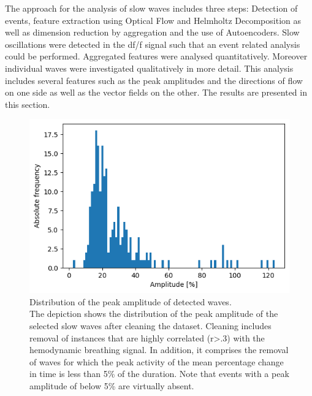  The approach for the analysis of slow waves includes three steps: Detection of events, feature extraction using Optical Flow and Helmholtz Decomposition as well as dimension reduction by aggregation and the use of Autoencoders. Slow oscillations were detected in the df/f signal such that an event related analysis could be performed. Aggregated features were analysed quantitatively. Moreover individual waves were investigated qualitatively in more detail. This analysis includes several features such as the peak amplitudes and the directions of flow on one side as well as the vector fields on the other. The results are presented in this section.\\
 \begin{figure}[!htb]
 \centering
 \includegraphics[width=\textwidth,height=\textheight,keepaspectratio]{Figures/selected_waves_distribution_of_peak_amplitude}
 \decoRule
 \caption[Distribution of the peak amplitude of detected waves]{Distribution of the peak amplitude of detected waves.\\The depiction shows the distribution of the peak amplitude of the selected slow waves after cleaning the dataset. Cleaning includes removal of instances that are highly correlated (r>.3) with the hemodynamic breathing signal. In addition, it comprises the removal of waves for which the peak activity of the mean percentage change in time is less than 5\% of the duration. Note that events with a peak amplitude of below 5\% are virtually absent.}
 \label{fig:selected_waves_distribution_of_peak_amplitude}
 \end{figure}
